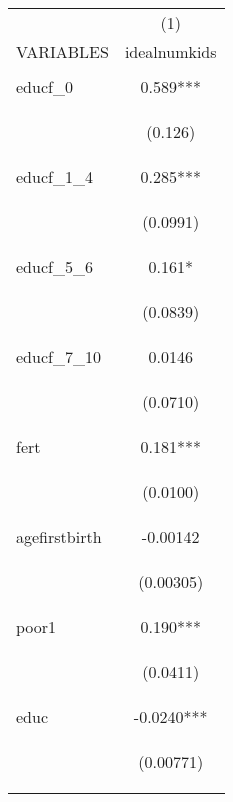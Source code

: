 \documentclass[]{article}
\begin{document}
\begin{center}
\begin{tabular}{lc} \hline
 & (1) \\
VARIABLES & idealnumkids \\ \hline
\vspace{4pt} & \begin{footnotesize}\end{footnotesize} \\
educf\_0 & 0.589*** \\
\vspace{4pt} & \begin{footnotesize}(0.126)\end{footnotesize} \\
educf\_1\_4 & 0.285*** \\
\vspace{4pt} & \begin{footnotesize}(0.0991)\end{footnotesize} \\
educf\_5\_6 & 0.161* \\
\vspace{4pt} & \begin{footnotesize}(0.0839)\end{footnotesize} \\
educf\_7\_10 & 0.0146 \\
\vspace{4pt} & \begin{footnotesize}(0.0710)\end{footnotesize} \\
fert & 0.181*** \\
\vspace{4pt} & \begin{footnotesize}(0.0100)\end{footnotesize} \\
agefirstbirth & -0.00142 \\
\vspace{4pt} & \begin{footnotesize}(0.00305)\end{footnotesize} \\
poor1 & 0.190*** \\
\vspace{4pt} & \begin{footnotesize}(0.0411)\end{footnotesize} \\
educ & -0.0240*** \\
\vspace{4pt} & \begin{footnotesize}(0.00771)\end{footnotesize} \\

\end{tabular}
\end{center}
\end{document}
